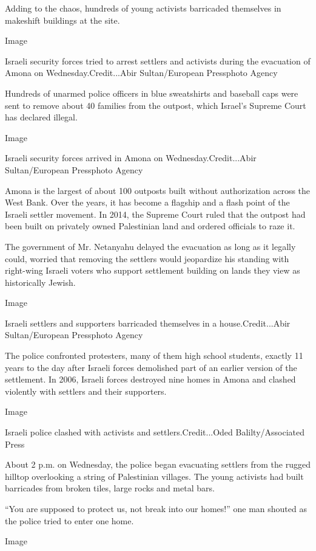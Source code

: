 Adding to the chaos, hundreds of young activists barricaded themselves
in makeshift buildings at the site.

Image

Israeli security forces tried to arrest settlers and activists during
the evacuation of Amona on Wednesday.Credit...Abir Sultan/European
Pressphoto Agency

Hundreds of unarmed police officers in blue sweatshirts and baseball
caps were sent to remove about 40 families from the outpost, which
Israel's Supreme Court has declared illegal.

Image

Israeli security forces arrived in Amona on Wednesday.Credit...Abir
Sultan/European Pressphoto Agency

Amona is the largest of about 100 outposts built without authorization
across the West Bank. Over the years, it has become a flagship and a
flash point of the Israeli settler movement. In 2014, the Supreme Court
ruled that the outpost had been built on privately owned Palestinian
land and ordered officials to raze it.

The government of Mr. Netanyahu delayed the evacuation as long as it
legally could, worried that removing the settlers would jeopardize his
standing with right-wing Israeli voters who support settlement building
on lands they view as historically Jewish.

Image

Israeli settlers and supporters barricaded themselves in a
house.Credit...Abir Sultan/European Pressphoto Agency

The police confronted protesters, many of them high school students,
exactly 11 years to the day after Israeli forces demolished part of an
earlier version of the settlement. In 2006, Israeli forces destroyed
nine homes in Amona and clashed violently with settlers and their
supporters.

Image

Israeli police clashed with activists and settlers.Credit...Oded
Balilty/Associated Press

About 2 p.m. on Wednesday, the police began evacuating settlers from the
rugged hilltop overlooking a string of Palestinian villages. The young
activists had built barricades from broken tiles, large rocks and metal
bars.

``You are supposed to protect us, not break into our homes!'' one man
shouted as the police tried to enter one home.

Image

